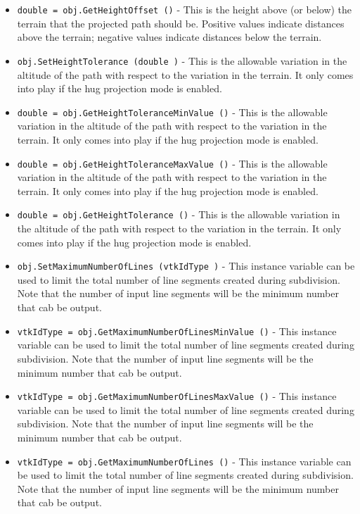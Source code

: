 \begin{itemize}
\item  \verb|double = obj.GetHeightOffset ()| -  This is the height above (or below) the terrain that the projected
 path should be. Positive values indicate distances above the terrain;
 negative values indicate distances below the terrain. 

\item  \verb|obj.SetHeightTolerance (double )| -  This is the allowable variation in the altitude of the path
 with respect to the variation in the terrain. It only comes
 into play if the hug projection mode is enabled.

\item  \verb|double = obj.GetHeightToleranceMinValue ()| -  This is the allowable variation in the altitude of the path
 with respect to the variation in the terrain. It only comes
 into play if the hug projection mode is enabled.

\item  \verb|double = obj.GetHeightToleranceMaxValue ()| -  This is the allowable variation in the altitude of the path
 with respect to the variation in the terrain. It only comes
 into play if the hug projection mode is enabled.

\item  \verb|double = obj.GetHeightTolerance ()| -  This is the allowable variation in the altitude of the path
 with respect to the variation in the terrain. It only comes
 into play if the hug projection mode is enabled.

\item  \verb|obj.SetMaximumNumberOfLines (vtkIdType )| -  This instance variable can be used to limit the total number of line
 segments created during subdivision. Note that the number of input line
 segments will be the minimum number that cab be output.

\item  \verb|vtkIdType = obj.GetMaximumNumberOfLinesMinValue ()| -  This instance variable can be used to limit the total number of line
 segments created during subdivision. Note that the number of input line
 segments will be the minimum number that cab be output.

\item  \verb|vtkIdType = obj.GetMaximumNumberOfLinesMaxValue ()| -  This instance variable can be used to limit the total number of line
 segments created during subdivision. Note that the number of input line
 segments will be the minimum number that cab be output.

\item  \verb|vtkIdType = obj.GetMaximumNumberOfLines ()| -  This instance variable can be used to limit the total number of line
 segments created during subdivision. Note that the number of input line
 segments will be the minimum number that cab be output.

\end{itemize}
